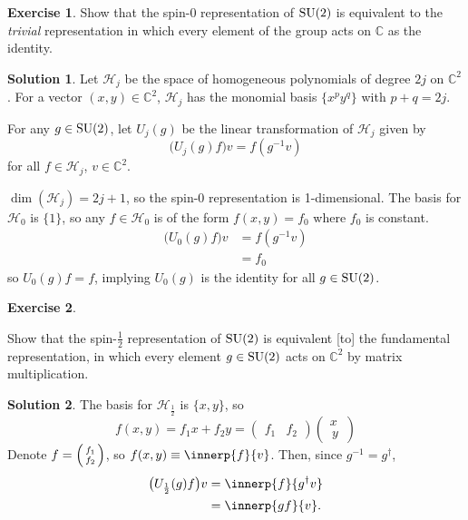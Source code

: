 \documentclass[11pt, a4paper]{report}
\theoremstyle{definition}
\newtheorem{exercise}{Exercise}[part]
\newtheorem{solution}{Solution}[part]
\newenvironment{ex}{\begin{exercise}}{\end{exercise}\pagebreak[1]}
\newenvironment{sol}{\begin{solution}}{\end{solution}\pagebreak[3]}
\newcommand*{\SU}{\ensuremath\text{SU}}
\begin{document}
\begin{ex}

Show that the spin-0 representation of $\SU(2)$ is equivalent to the \emph{trivial} representation in which every element of the group acts on $\mathbb{C}$ as the identity.

\end{ex}

\begin{sol}

Let $\mathcal{H}_j$ be the space of homogeneous polynomials of degree $2j$ on $\mathbb{C}^2$.
For a vector $(x, y) \in \mathbb{C}^2$, $\mathcal{H}_j$ has the monomial basis $\{x^p y^q\}$ with $p + q = 2j$.

For any $g \in \SU(2)$, let $U_j(g)$ be the linear transformation of $\mathcal{H}_j$ given by
\[
    \bigl(U_j(g) f\bigr) v = f(g^{-1} v)
\]
for all $f \in \mathcal{H}_j$, $v \in \mathbb{C}^2$.

$\dim(\mathcal{H}_j) = 2j + 1$, so the spin-0 representation is 1-dimensional.
The basis for $\mathcal{H}_0$ is $\{1\}$, so any $f \in \mathcal{H}_0$ is of the form $f(x, y) = f_0$ where $f_0$ is constant.
\begin{align*}
    \bigl( U_0(g) f \bigr) v &= f(g^{-1} v) \\
                             &= f_0
\end{align*}
so $U_0(g) f = f$, implying $U_0(g)$ is the identity for all $g \in \SU(2)$.

\end{sol}

\begin{ex}\label{ex:spinhalffundamentalrepresentation}

Show that the spin-$\frac{1}{2}$ representation of $\SU(2)$ is equivalent [to] the fundamental representation, in which every element $g \in \SU(2)$ acts on $\mathbb{C}^2$ by matrix multiplication.

\end{ex}

\begin{sol}

The basis for $\mathcal{H}_\frac{1}{2}$ is $\{x, y\}$, so
\[
    f(x, y) = f_1 x + f_2 y =
    \begin{pmatrix}
        f_1 & f_2
    \end{pmatrix}
    \begin{pmatrix}
        x \\ \, y \,
    \end{pmatrix}
\]
Denote $f = \begin{psmallmatrix} f_1 \\ f_2 \end{psmallmatrix}$, so $f(x, y) \equiv \innerp{f}{v}$.
Then, since $g^{-1} = g^\dagger$,
\begin{align*}
    \bigl( U_\frac{1}{2}(g) f \bigr) v &= \innerp{f}{g^\dagger v} \\
                                       &= \innerp{gf}{v}.
\end{align*}

\end{sol}
\end{document}
